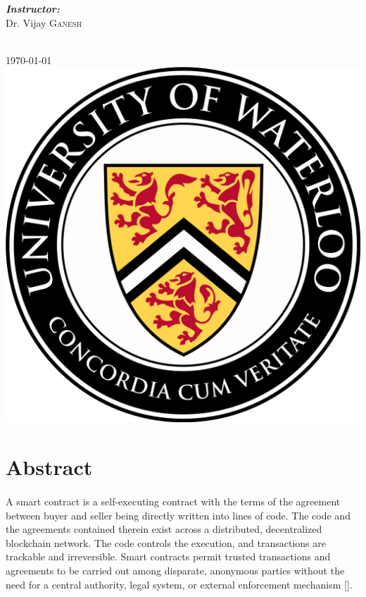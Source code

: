 \documentclass[11pt]{article}
\begin{document}
\begin{titlepage}
\begin{minipage}{0.4\textwidth}
\end{minipage}
\begin{minipage}{0.4\textwidth}
\begin{flushright} \large
\emph{\bfseries Instructor:} \\
Dr. Vijay \textsc{Ganesh} %
\end{flushright}
\end{minipage}\\[2cm]
{\large \today}\\[1cm] 
\includegraphics[scale=.14]{figures/waterloo.png}%
\vfill %

\end{titlepage}


\section{Abstract}
\paragraph{}
A smart contract is a self-executing contract with the terms of the agreement between buyer and seller being directly written into lines of code. The code and the agreements contained therein exist across a distributed, decentralized blockchain network. The code controls the execution, and transactions are trackable and irreversible. Smart contracts permit trusted transactions and agreements to be carried out among disparate, anonymous parties without the need for a central authority, legal system, or external enforcement mechanism [\cite{Website:1}]. 
\end{document}
